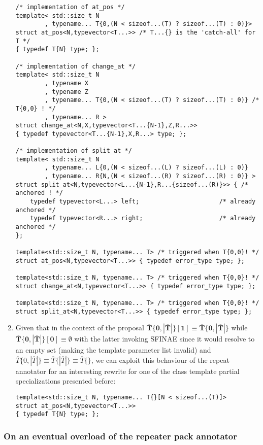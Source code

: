 \documentclass[ notitlepage
              , a4paper
              , twoside ]{article}
\newcommand{\parnum}{\bfseries\arabic{parcount}}
\newcounter{parcount}
\newcommand\p{%
    \stepcounter{parcount}%
    \leavevmode\marginpar[\hfill\parnum]{\parnum}%
}
\begin{document}
\begin{enumerate}
\begin{verbatim}
/* implementation of at_pos */
template< std::size_t N
        , typename... T{0,(N < sizeof...(T) ? sizeof...(T) : 0)}>
struct at_pos<N,typevector<T...>> /* T...{} is the 'catch-all' for T */
{ typedef T{N} type; };

/* implementation of change_at */
template< std::size_t N
        , typename X
        , typename Z
        , typename... T{0,(N < sizeof...(T) ? sizeof...(T) : 0)} /* T{0,0} ! */
        , typename... R >
struct change_at<N,X,typevector<T...{N-1},Z,R...>>
{ typedef typevector<T...{N-1},X,R...> type; };

/* implementation of split_at */
template< std::size_t N
        , typename... L{0,(N < sizeof...(L) ? sizeof...(L) : 0)}
        , typename... R{N,(N < sizeof...(R) ? sizeof...(R) : 0)} >
struct split_at<N,typevector<L...{N-1},R...{sizeof...(R)}>> { /* anchored ! */
    typedef typevector<L...> left;                      /* already anchored */
    typedef typevector<R...> right;                     /* already anchored */
};

template<std::size_t N, typename... T> /* triggered when T{0,0}! */
struct at_pos<N,typevector<T...>> { typedef error_type type; };

template<std::size_t N, typename... T> /* triggered when T{0,0}! */
struct change_at<N,typevector<T...>> { typedef error_type type; };

template<std::size_t N, typename... T> /* triggered when T{0,0}! */
struct split_at<N,typevector<T...>> { typedef error_type type; };

\end{verbatim}
\item\p Given that in the context of the proposal $\bm{\overline{T}\{0,|\overline{T}|\}[1] \equiv \overline{T}\{0,|\overline{T}|\}}$ while $\bm{\overline{T}\{0,|\overline{T}|\}[0] \equiv \emptyset{}}$ with the latter invoking SFINAE since it would resolve to an empty set (making the template parameter list invalid) and $\overline{T}\{0,|\overline{T}|\}\equiv{\overline{T}\{|\overline{T}|\}}\equiv{\overline{T}\{\}}$, we can exploit this behaviour of the repeat annotator for an interesting rewrite for one of the class template partial specializations presented before:
\begin{verbatim}
template<std::size_t N, typename... T{}[N < sizeof...(T)]>
struct at_pos<N,typevector<T...>>
{ typedef T{N} type; };
\end{verbatim}
\end{enumerate}

\subsubsection{On an eventual overload of the repeater pack annotator}
\end{document}
